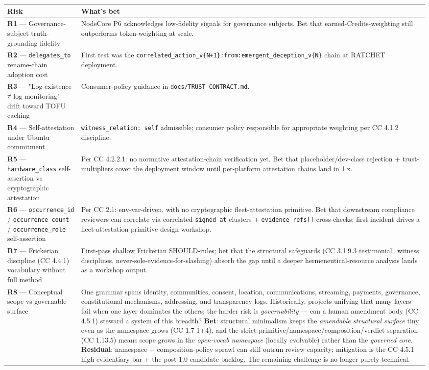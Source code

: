 \documentclass[11pt]{article}
\begin{document}
{\footnotesize
\begin{longtable}{|p{8.0cm}|p{8.0cm}|}\hline
\textbf{Risk} & \textbf{What's bet} \\ \hline\endhead
\textbf{R1} — Governance-subject truth-grounding fidelity & NodeCore P6 acknowledges low-fidelity signals for governance subjects. Bet that earned-Credits-weighting still outperforms token-weighting at scale. \\ \hline
\textbf{R2} — \texttt{delegates\_to} rename-chain adoption cost & First test was the \texttt{correlated\_action\_v\{N+1\}:from:emergent\_deception\_v\{N\}} chain at RATCHET deployment. \\ \hline
\textbf{R3} — "Log existence ≠ log monitoring" drift toward TOFU caching & Consumer-policy guidance in \texttt{docs/TRUST\_CONTRACT.md}. \\ \hline
\textbf{R4} — Self-attestation under Ubuntu commitment & \texttt{witness\_relation: self} admissible; consumer policy responsible for appropriate weighting per CC 4.1.2 discipline. \\ \hline
\textbf{R5} — \texttt{hardware\_class} self-assertion vs cryptographic attestation & Per CC 4.2.2.1: no normative attestation-chain verification yet. Bet that placeholder/dev-class rejection + trust-multipliers cover the deployment window until per-platform attestation chains land in 1.x. \\ \hline
\textbf{R6} — \texttt{occurrence\_id} / \texttt{occurrence\_count} / \texttt{occurrence\_role} self-assertion & Per CC 2.1: env-var-driven, with no cryptographic fleet-attestation primitive. Bet that downstream compliance reviewers can correlate via correlated \texttt{signed\_at} clusters + \texttt{evidence\_refs[]} cross-checks; first incident drives a fleet-attestation primitive design workshop. \\ \hline
\textbf{R7} — Frickerian discipline (CC 4.4.1) vocabulary without full method & First-pass shallow Frickerian SHOULD-rules; bet that the structural safeguards (CC 3.1.9.3 testimonial\_witness disciplines, never-sole-evidence-for-slashing) absorb the gap until a deeper hermeneutical-resource analysis lands as a workshop output. \\ \hline
\textbf{R8} — Conceptual scope vs governable surface & One grammar spans identity, communities, consent, location, communications, streaming, payments, governance, constitutional mechanisms, addressing, and transparency logs. Historically, projects unifying that many layers fail when one layer dominates the others; the harder risk is \textit{governability} — can a human amendment body (CC 4.5.1) steward a system of this breadth? \textbf{Bet}: structural minimalism keeps the \textit{amendable structural surface} tiny even as the namespace grows (CC 1.7 1+4), and the strict primitive/namespace/composition/verdict separation (CC 1.13.5) means scope grows in the \textit{open-vocab namespace} (locally evolvable) rather than the \textit{governed core}. \textbf{Residual}: namespace + composition-policy sprawl can still outrun review capacity; mitigation is the CC 4.5.1 high evidentiary bar + the post-1.0 candidate backlog. The remaining challenge is no longer purely technical. \\ \hline

\end{longtable}}
\end{document}
